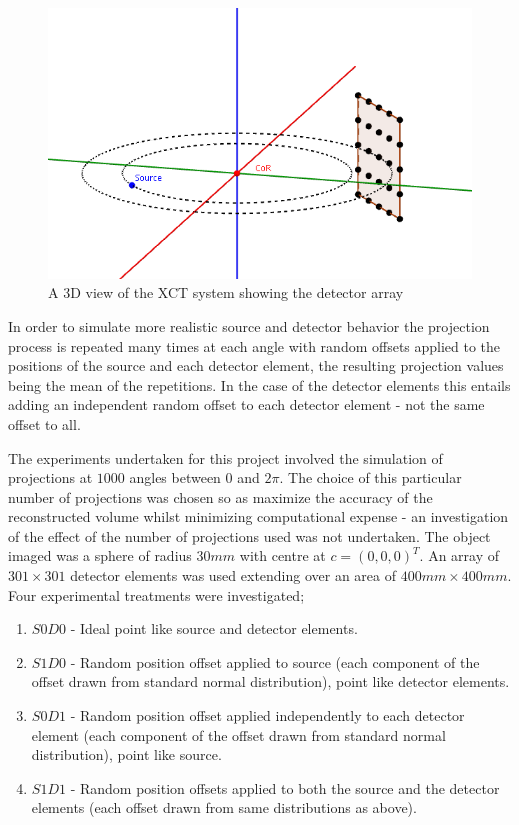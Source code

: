 \documentclass[
  twoside,
  11pt, a4paper,
  footinclude=true,
  headinclude=true,
  cleardoublepage=empty
]{scrbook}
\begin{document}
\begin{figure}[h!]
  \centering
    \includegraphics[width=\textwidth]{figures/3dxctsystem.png}
    \caption{A 3D view of the XCT system showing the detector array}
    \label{3dxctsystem}
\end{figure}

In order to simulate more realistic source and detector behavior the projection process is repeated many times at each angle with random offsets applied to the positions of the source and each detector element, the resulting projection values being the mean of the repetitions. In the case of the detector elements this entails adding an independent random offset to each detector element - not the same offset to all.

The experiments undertaken for this project involved the simulation of projections at $1000$ angles between $0$ and $2\pi$. The choice of this particular number of projections was chosen so as maximize the accuracy of the reconstructed volume whilst minimizing computational expense - an investigation of the effect of the number of projections used was not undertaken. The object imaged was a sphere of radius $30mm$ with centre at $c = (0,0,0)^T$. An array of $301\times301$ detector elements was used extending over an area of $400mm\times400mm$. Four experimental treatments were investigated;

\begin{enumerate}
\item $S0D0$ - Ideal point like source and detector elements.
\item $S1D0$ - Random position offset applied to source (each component of the offset drawn from standard normal distribution), point like detector elements.
\item $S0D1$ - Random position offset applied independently to each detector element (each component of the offset drawn from standard normal distribution), point like source.
\item $S1D1$ - Random position offsets applied to both the source and the detector elements (each offset drawn from same distributions as above).
\end{enumerate}
\end{document}
